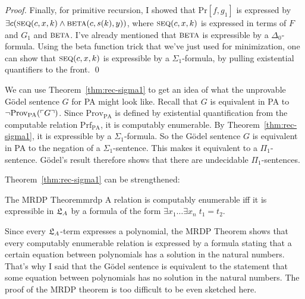 \begin{proof}
  Finally, for primitive recursion,
  I showed that $\mathrm{Pr}[f,g_1]$ is expressed by
  $\exists c(\smallcaps{Seq}(c,x,k) \land \smallcaps{beta}(c,s(k),y))$,
  where $\smallcaps{Seq}(c,x,k)$ is expressed in terms of $F$ and $G_1$ and $\smallcaps{beta}$.
  I've already mentioned that $\smallcaps{beta}$ is expressible by a $\Delta_{0}$-formula.
  Using the beta function trick that we've just used for minimization,
  one can show that $\smallcaps{Seq}(c,x,k)$ is expressible by a $\Sigma_{1}$-formula,
  by pulling existential quantifiers to the front.
  \qed
\end{proof}

We can use Theorem~\ref{thm:rec-sigma1} to get an idea of what the unprovable Gödel sentence $G$ for PA might look like.
Recall that $G$ is equivalent in PA to $\neg \mathrm{Prov}_{\mathrm{PA}}(\ulcorner G \urcorner)$.
Since $\mathrm{Prov}_{\mathrm{PA}}$ is defined by existential quantification from the computable relation $\mathrm{Prf}_{\mathrm{PA}}$,
it is computably enumerable.
By Theorem~\ref{thm:rec-sigma1},
it is expressible by a $\Sigma_{1}$-formula.
So the Gödel sentence $G$ is equivalent in PA to the negation of a $\Sigma_{1}$-sentence.
This makes it equivalent to a $\Pi_{1}$-sentence.
Gödel's result therefore shows that
there are undecidable $\Pi_{1}$-sentences.

Theorem~\ref{thm:rec-sigma1} can be strengthened:

\begin{theorem}{The MRDP Theorem}{mrdp}
  A relation is computably enumerable iff it is expressible in $\mathfrak{L}_A$ by a formula of the form $\exists x_1\ldots \exists x_n \; t_1 = t_2$.
\end{theorem}

Since every $\mathfrak{L}_A$-term expresses a polynomial,
the MRDP Theorem shows that every computably enumerable relation is expressed by a formula
stating that a certain equation between polynomials has a solution in the natural numbers.
That's why I said that the Gödel sentence is equivalent to the statement that
some equation between polynomials has no solution in the natural numbers.
The proof of the MRDP theorem is too difficult to be even sketched here.

